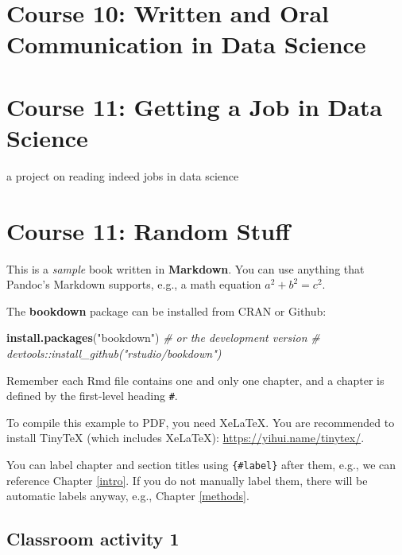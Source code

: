 \documentclass[]{book}
\newenvironment{Shaded}{\begin{snugshade}}{\end{snugshade}}
\newcommand{\CommentTok}[1]{\textcolor[rgb]{0.56,0.35,0.01}{\textit{#1}}}
\newcommand{\KeywordTok}[1]{\textcolor[rgb]{0.13,0.29,0.53}{\textbf{#1}}}
\newcommand{\NormalTok}[1]{#1}
\newcommand{\StringTok}[1]{\textcolor[rgb]{0.31,0.60,0.02}{#1}}
\begin{document}
\hypertarget{communication}{%
\chapter*{Course 10: Written and Oral Communication in Data Science}\label{communication}}

\hypertarget{getting-jobs}{%
\chapter*{Course 11: Getting a Job in Data Science}\label{getting-jobs}}

a project on reading indeed jobs in data science

\hypertarget{random}{%
\chapter*{Course 11: Random Stuff}\label{random}}

This is a \emph{sample} book written in \textbf{Markdown}. You can use anything that Pandoc's Markdown supports, e.g., a math equation \(a^2 + b^2 = c^2\).

The \textbf{bookdown} package can be installed from CRAN or Github:

\begin{Shaded}
\begin{Highlighting}[]
\KeywordTok{install.packages}\NormalTok{(}\StringTok{"bookdown"}\NormalTok{)}
\CommentTok{# or the development version}
\CommentTok{# devtools::install_github("rstudio/bookdown")}
\end{Highlighting}
\end{Shaded}

Remember each Rmd file contains one and only one chapter, and a chapter is defined by the first-level heading \texttt{\#}.

To compile this example to PDF, you need XeLaTeX. You are recommended to install TinyTeX (which includes XeLaTeX): \url{https://yihui.name/tinytex/}.

You can label chapter and section titles using \texttt{\{\#label\}} after them, e.g., we can reference Chapter \ref{intro}. If you do not manually label them, there will be automatic labels anyway, e.g., Chapter \ref{methods}.

\hypertarget{classroom-activity-1}{%
\section*{Classroom activity 1}\label{classroom-activity-1}}
\end{document}
